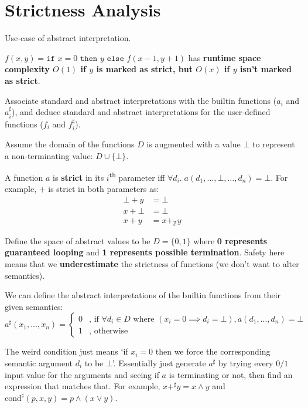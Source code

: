 \documentclass[a4paper, 11pt]{article}
\begin{document}
\section*{Strictness Analysis}
{
    Use-case of abstract interpretation.

    \(f(x,y) = \texttt{if }x = 0\texttt{ then }y\texttt{ else }f(x-1, y+1)\) has \textbf{runtime space complexity \(O(1)\) if \(y\) is marked as strict, but \(O(x)\) if \(y\) isn't marked as strict}.

    Associate standard and abstract interpretations with the builtin functions (\(a_i\) and \(a^\sharp_i\)), and deduce standard and abstract interpretations for the user-defined functions (\(f_i\) and \(f^\sharp_i\)).

    Assume the domain of the functions \(D\) is augmented with a value \(\bot\) to represent a non-terminating value: \(D \cup \{\bot\}\).

    A function \(a\) is \textbf{strict} in its \(i\)\textsuperscript{th} parameter iff \(\forall d_i.\; a(d_1, \dots, \bot, \dots, d_n) = \bot\). For example, \(+\) is strict in both parameters as:
    \begin{align*}
    \bot + y &= \bot \\
    x + \bot &= \bot \\
    x + y    &= x +_\mathbb{Z} y
    \end{align*}

    Define the space of abstract values to be \(D = \{0, 1\}\) where \textbf{0 represents guaranteed looping} and \textbf{1 represents possible termination}. Safety here means that we \textbf{underestimate} the strictness of functions (we don't want to alter semantics).

    We can define the abstract interpretations of the builtin functions from their given semantics:
    \begin{equation*}
    a^\sharp(x_1, ..., x_n) = \begin{cases}
        0 & \text{, if }\forall d_i \in D \text{ where }(x_i = 0 \implies d_i = \bot), a(d_1, ..., d_n) = \bot \\
        1 & \text{, otherwise}
    \end{cases}
    \end{equation*}

    The weird condition just means `if \(x_i = 0\) then we force the corresponding semantic argument \(d_i\) to be \(\bot\)'. Essentially just generate \(a^\sharp\) by trying every \(0/1\) input value for the arguments and seeing if \(a\) is terminating or not, then find an expression that matches that. For example, \(x +^\sharp y = x \wedge y\) and \(\text{cond}^\sharp(p, x, y) = p \wedge (x \vee y)\).

}
\end{document}
